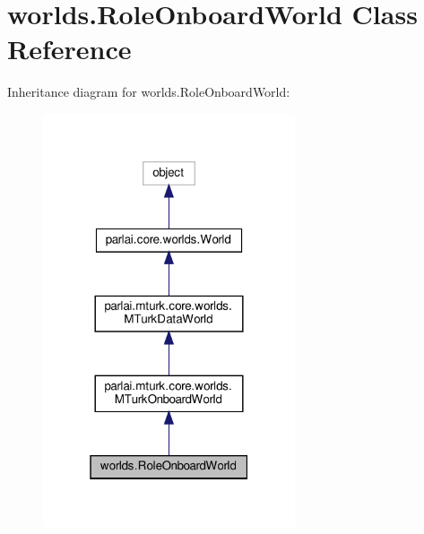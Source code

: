\hypertarget{classworlds_1_1RoleOnboardWorld}{}\section{worlds.\+Role\+Onboard\+World Class Reference}
\label{classworlds_1_1RoleOnboardWorld}


Inheritance diagram for worlds.\+Role\+Onboard\+World\+:
\nopagebreak
\begin{figure}[H]
\begin{center}
\leavevmode
\includegraphics[width=211pt]{classworlds_1_1RoleOnboardWorld__inherit__graph}
\end{center}
\end{figure}


